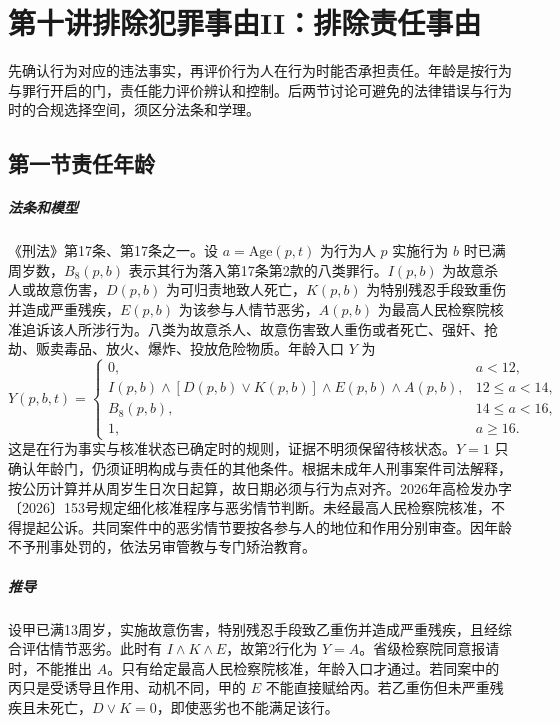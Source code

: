 \chapter{第十讲\quad 排除犯罪事由II：排除责任事由}
\label{lecture:10}
\par

先确认行为对应的违法事实，再评价行为人在行为时能否承担责任。年龄是按行为与罪行开启的门，责任能力评价辨认和控制。后两节讨论可避免的法律错误与行为时的合规选择空间，须区分法条和学理。

\section{第一节\quad 责任年龄}

\paragraph{法条和模型}
《刑法》第17条、第17条之一。设 \(a=\mathrm{Age}(p,t)\) 为行为人 \(p\) 实施行为 \(b\) 时已满周岁数，\(B_8(p,b)\) 表示其行为落入第17条第2款的八类罪行。\(I(p,b)\) 为故意杀人或故意伤害，\(D(p,b)\) 为可归责地致人死亡，\(K(p,b)\) 为特别残忍手段致重伤并造成严重残疾，\(E(p,b)\) 为该参与人情节恶劣，\(A(p,b)\) 为最高人民检察院核准追诉该人所涉行为。八类为故意杀人、故意伤害致人重伤或者死亡、强奸、抢劫、贩卖毒品、放火、爆炸、投放危险物质。年龄入口 \(Y\) 为
\[
Y(p,b,t)=
\begin{cases}
0, &a<12,\\
I(p,b)\land[D(p,b)\lor K(p,b)]\land E(p,b)\land A(p,b),
   &12\le a<14,\\
B_8(p,b), &14\le a<16,\\
1, &a\ge16.
\end{cases}
\]
这是在行为事实与核准状态已确定时的规则，证据不明须保留待核状态。\(Y=1\) 只确认年龄门，仍须证明构成与责任的其他条件。根据未成年人刑事案件司法解释，按公历计算并从周岁生日次日起算，故日期必须与行为点对齐。2026年高检发办字〔2026〕153号规定细化核准程序与恶劣情节判断。未经最高人民检察院核准，不得提起公诉。共同案件中的恶劣情节要按各参与人的地位和作用分别审查。因年龄不予刑事处罚的，依法另审管教与专门矫治教育。

\paragraph{推导}
设甲已满13周岁，实施故意伤害，特别残忍手段致乙重伤并造成严重残疾，且经综合评估情节恶劣。此时有 \(I\land K\land E\)，故第2行化为 \(Y=A\)。省级检察院同意报请时，不能推出 \(A\)。只有给定最高人民检察院核准，年龄入口才通过。若同案中的丙只是受诱导且作用、动机不同，甲的 \(E\) 不能直接赋给丙。若乙重伤但未严重残疾且未死亡，\(D\lor K=0\)，即使恶劣也不能满足该行。

